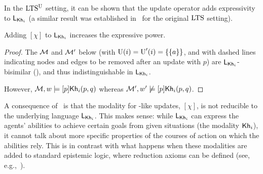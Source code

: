 In the $\textup{LTS$^\text{\textup{U}}$}$ setting, it can be shown that the update operator adds expressivity to $\mathsf{L}_{{\sf Kh}_i}$ (a similar result was established in~\cite{Wang2016} for the original $\textup{LTS}$ setting).

\medskip 

\begin{proposition}\label{prop:pal-exp}
Adding $[\chi]$ to $\mathsf{L}_{{\sf Kh}_i}$ increases the expressive power.
\end{proposition}

\begin{proof}
  The \ultss $\mathcal{M}$ and $\mathcal{M}'$ below (with $\operatorname{U}(i)=\operatorname{U}'(i)=\{ \{ a \} \}$, and with dashed lines indicating nodes and edges to be removed after an update with $p$) are $\mathsf{L}_{{\sf Kh}_i}$-bisimilar (), and thus indistinguishable in $\mathsf{L}_{{\sf Kh}_i}$. 
\begin{center}
  \end{center}
However, $\mathcal{M},w\models[p]{\sf Kh}_i(p,q)$ whereas
$\mathcal{M}',w'\not\models[p]{\sf Kh}_i(p,q)$.
\end{proof}

A consequence of~ is that the modality for \PAL-like updates, $[\chi]$, is not reducible to the underlying language $\mathsf{L}_{{\sf Kh}_i}$. This makes sense: while $\mathsf{L}_{{\sf Kh}_i}$ can express the agents' abilities to achieve certain goals from given situations (the modality ${\sf Kh}_i$), it cannot talk about more specific properties of the courses of action on which the abilities rely. This is in contrast with what happens when these modalities are added to standard epistemic logic, where reduction axioms can be defined (see, e.g.,~\cite{DELbook}).

